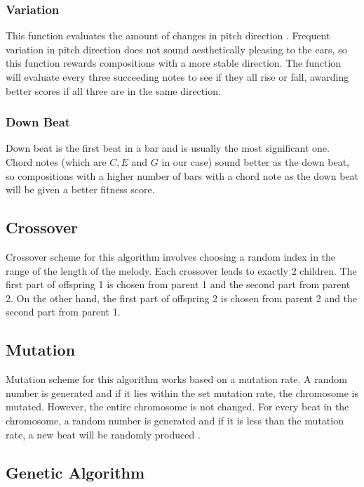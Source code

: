 \documentclass[conference]{IEEEtran}
\begin{document}
\subsubsection{Variation}
This function evaluates the amount of changes in pitch direction \cite{b2}. Frequent variation in pitch direction does not sound aesthetically pleasing to the ears, so this function rewards compositions with a more stable direction. The function will evaluate every three succeeding notes to see if they all rise or fall, awarding better scores if all three are in the same direction.

\subsubsection{Down Beat}
Down beat is the first beat in a bar and is usually the most significant one. Chord notes (which are $C, E$ and $G$ in our case) sound better as the down beat, so compositions with a higher number of bars with a chord note as the down beat will be given a better fitness score.

\subsection{Crossover}
Crossover scheme for this algorithm involves choosing a random index in the range of the length of the melody. Each crossover leads to exactly 2 children. The first part of offspring 1 is chosen from parent 1 and the second part from parent 2. On the other hand, the first part of offspring 2 is chosen from parent 2 and the second part from parent 1.

\subsection{Mutation}
Mutation scheme for this algorithm works based on a mutation rate. A random number is generated and if it lies within the set mutation rate, the chromosome is mutated. However, the entire chromosome is not changed. For every beat in the chromosome, a random number is generated and if it is less than the mutation rate, a new beat will be randomly produced \cite{b7}.

\subsection{Genetic Algorithm}
\end{document}
